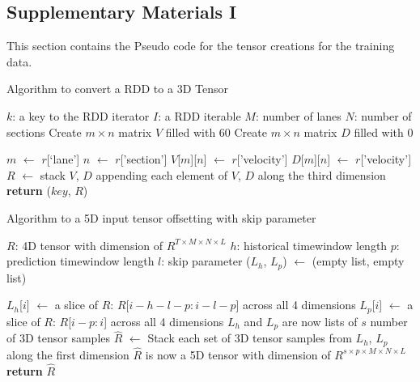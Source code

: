 \documentclass[11pt]{uonthesis}
\begin{document}
\begin{appendices}

\chapter{Supplementary Materials I}

This section contains the Pseudo code for the tensor creations for the training data.

\begin{algorithm}
    \caption{Algorithm to convert a RDD to a 3D Tensor}
    \label{alg:rddto3d}
    \begin{algorithmic}[1]
    \State $k$: a key to the RDD iterator
    \State $I$: a RDD iterable
    \State $M$: number of lanes
    \State $N$: number of sections
        \State Create $m \times n$ matrix $V$ filled with 60 
        \State Create $m \times n$ matrix $D$ filled with 0
    
            \State $m$ $\gets$ $r$[`lane']
            \State $n$ $\gets$ $r$['section']
            \State $V$[$m$][$n$] $\gets$ $r$['velocity']
            \State $D$[$m$][$n$] $\gets$ $r$['velocity']
        \EndFor
        \State $R$ $\gets$ stack $V$, $D$ appending each element of $V$, $D$ along the third dimension
        \State \textbf{return} ($key$, $R$)
        \EndProcedure
    \end{algorithmic}
\end{algorithm}

\begin{algorithm}
    \caption{Algorithm to a 5D input tensor offsetting with skip parameter}
    \label{alg:offset4d}
    \begin{algorithmic}[1]
    \State $R$: 4D tensor with dimension of $R^{T{\times}M{\times}N{\times}L}$
    \State $h$: historical timewindow length
    \State $p$: prediction timewindow length
    \State $l$: skip parameter
        \State ($L_h$, $L_p$) $\gets$ (empty list, empty list) 
    
            \State $L_h$[$i$] $\gets$ a slice of $R$: $R$[$i-h-l-p:i-l-p$] across all 4 dimensions
            \State $L_p$[$i$] $\gets$ a slice of $R$: $R$[$i-p:i$] across all 4 dimensions
        \EndFor \Comment $L_h$ and $L_p$ are now lists of $s$ number of 3D tensor samples
        \State $\hat{R}$ $\gets$ Stack each set of 3D tensor samples from $L_h$, $L_p$ along the first dimension \Comment $\hat{R}$ is now a 5D tensor with dimension of $R^{s{\times}p{\times}M{\times}N{\times}L}$
        \State \textbf{return} $\hat{R}$
        \EndProcedure
    \end{algorithmic}
\end{algorithm}
    


\end{appendices}
\end{document}
